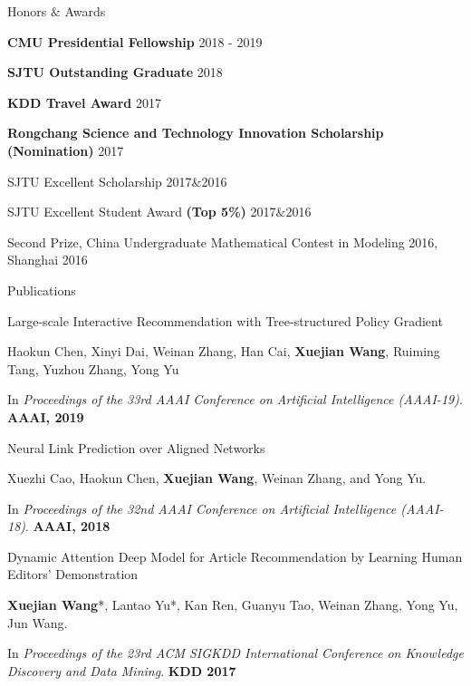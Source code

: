 \documentclass{resume} %
\begin{document}
\begin{rSection}{Honors $\&$ Awards}
\begin{rSubsection}{}{}{}{}
\item[] \textbf{CMU Presidential Fellowship} \hfill{2018 - 2019}
\item[] \textbf{SJTU Outstanding Graduate} \hfill{2018}
\item[] \textbf{KDD Travel Award} \hfill{2017}
\item[] \textbf{Rongchang Science and Technology Innovation Scholarship (Nomination)} \hfill{2017}
\item[] SJTU Excellent Scholarship \hfill{2017$\&$2016}
\item[] SJTU Excellent Student Award \textbf{(Top 5\%)}  \hfill{2017$\&$2016}
\item[] Second Prize, China Undergraduate Mathematical Contest in Modeling 2016, Shanghai \hfill{2016}
\end{rSubsection}
\end{rSection}

\begin{rSection}{Publications}
\begin{rSubsection}{Large-scale Interactive Recommendation with Tree-structured Policy Gradient}{}{}{}
\item Haokun Chen, Xinyi Dai, Weinan Zhang, Han Cai, \textbf{Xuejian Wang}, Ruiming Tang, Yuzhou Zhang, Yong Yu
\item In \emph{Proceedings of the 33rd AAAI Conference on Artificial Intelligence (AAAI-19)}. \textbf{AAAI, 2019}
\end{rSubsection}
\vspace{-2pt}
\begin{rSubsection}{Neural Link Prediction over Aligned Networks}{}{}{}
\item Xuezhi Cao, Haokun Chen, \textbf{Xuejian Wang}, Weinan Zhang, and Yong Yu.
\item In \emph{Proceedings of the 32nd AAAI Conference on Artificial Intelligence (AAAI-18)}. \textbf{AAAI, 2018}
\end{rSubsection}
\vspace{-2pt}
\begin{rSubsection}{Dynamic Attention Deep Model for Article Recommendation by Learning Human Editors' Demonstration}{}{}{}
\item \textbf{Xuejian Wang}*, Lantao Yu*, Kan Ren, Guanyu Tao, Weinan Zhang, Yong Yu, Jun Wang.
\item In \emph{Proceedings of the 23rd ACM SIGKDD International Conference on Knowledge Discovery and Data Mining}. \textbf{KDD 2017}
\end{rSubsection}
\end{rSection}
\end{document}
